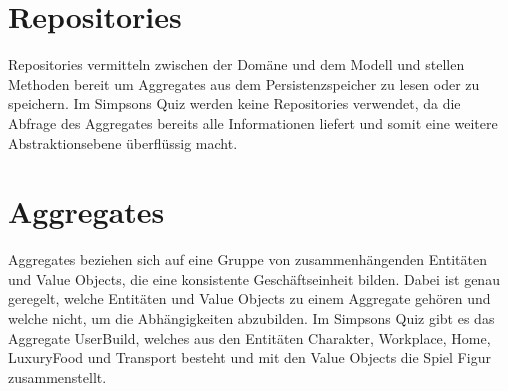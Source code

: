 \section{Repositories}

Repositories vermitteln zwischen der Domäne und dem Modell und stellen Methoden bereit um Aggregates aus dem Persistenzspeicher zu lesen oder zu speichern. Im Simpsons Quiz werden keine Repositories verwendet, da die Abfrage des Aggregates bereits alle Informationen liefert und somit eine weitere Abstraktionsebene überflüssig macht. 
\newpage
\section{Aggregates}
Aggregates beziehen sich auf eine Gruppe von zusammenhängenden Entitäten und Value Objects, die eine konsistente Geschäftseinheit bilden. Dabei ist genau geregelt, welche Entitäten und Value Objects zu einem Aggregate gehören und welche nicht, um die Abhängigkeiten abzubilden. \newline
Im Simpsons Quiz gibt es das Aggregate UserBuild, welches aus den Entitäten Charakter, Workplace, Home, LuxuryFood und Transport besteht und mit den Value Objects die Spiel Figur zusammenstellt.
